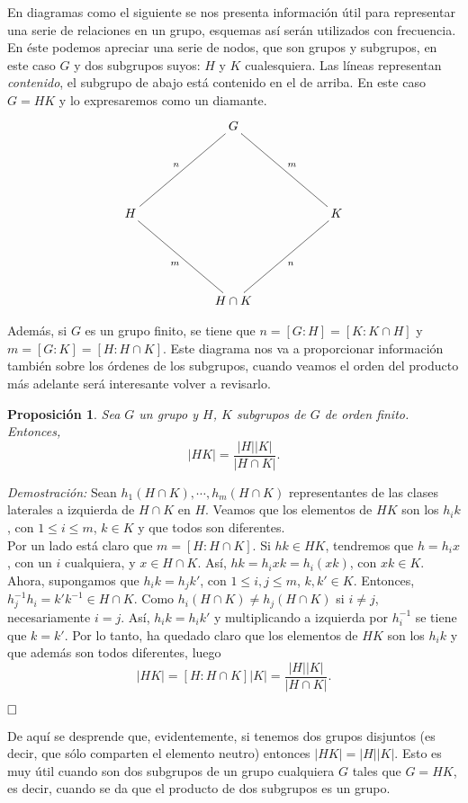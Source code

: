 \documentclass[12pt]{article}
\newtheorem{proposition}[theorem]{Proposición}
\begin{document}
En diagramas como el siguiente se nos presenta información útil para representar una serie de relaciones en un grupo, esquemas así serán utilizados con frecuencia. En éste podemos apreciar una serie de nodos, que son grupos y subgrupos, en este caso $G$ y dos subgrupos suyos: $H$ y $K$ cualesquiera. Las líneas representan \textit{contenido}, el subgrupo de abajo está contenido en el de arriba. En este caso $G=HK$ y lo expresaremos como un diamante. 
$$\xymatrix @=2cm {&G \ar@{-}[ld]_n \ar@{-}[rd]^m  \\ H \ar@{-}[rd]_m & & K \ar@{-}[ld]^n \\ &H \cap K }$$

Además, si $G$ es un grupo finito, se tiene que $n= [G:H] = [K: K \cap H]$ y $m= [G:K] = [H : H \cap K]$. Este diagrama nos va a proporcionar información también sobre los órdenes de los subgrupos, cuando veamos el orden del producto más adelante será interesante volver a revisarlo.

\begin{proposition} Sea $G$ un grupo y $H$, $K$ subgrupos de $G$ de orden finito. Entonces, $$|HK| = \dfrac{|H||K|}{|H \cap K|}.$$
\end{proposition}
\emph{Demostración: } Sean $h_{1}(H \cap K), \cdots, h_{m}(H \cap K)$ representantes de las clases laterales a izquierda de $H\cap K$ en $H$. Veamos que los elementos de $HK$ son los $h_{i}k$, con $1 \leq i \leq m$, $k \in K$ y que todos son diferentes.\vspace{0.2cm}\\
Por un lado está claro que $m = [H : H \cap K ]$. Si $hk \in HK$, tendremos que $h = h_{i}x$, con un $i$ cualquiera, y $x \in H \cap K$. Así, $hk = h_{i}xk = h_{i}(xk)$, con $xk \in K$. Ahora, supongamos que $h_{i}k =h_{j}k'$, con $1 \leq i,j \leq m$, $k, k' \in K$. Entonces, $h_{j}^{-1}h_{i} = k'k^{-1} \in H \cap K$. Como $h_{i}(H \cap K) \neq h_{j}(H \cap K)$ si $i \neq j$, necesariamente $i =j$. Así, $h_{i}k =h_{i}k'$ y multiplicando a izquierda por $h_{i}^{-1}$ se tiene que $k = k'$. Por lo tanto, ha quedado claro que los elementos de $HK$ son los $h_{i}k$ y que además son todos diferentes, luego $$|HK| = [H : H\cap K]|K| = \dfrac{|H||K|}{|H \cap K|}.$$

$\hfill \square$

De aquí se desprende que, evidentemente, si tenemos dos grupos disjuntos (es decir, que sólo comparten el elemento neutro) entonces $|HK| = |H||K|$. Esto es muy útil cuando son dos subgrupos de un grupo cualquiera $G$ tales que $G = HK$, es decir, cuando se da que el producto de dos subgrupos es un grupo.
\end{document}
